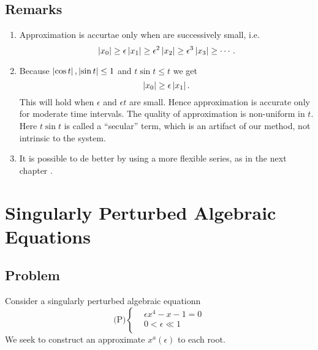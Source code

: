 \documentclass[12pt,twoside]{article}
\begin{document}
\subsection{Remarks}
\begin{enumerate}[(1)]
\item Approximation is accurtae only when are successively small, i.e.
$$\left|{x_0}\right|\ge\epsilon\left|{x_1}\right|\ge\epsilon^2\left|{x_2}\right|\ge\epsilon^3\left|{x_3}\right|\ge\cdots.$$
\item Because $\left|{\cos t}\right|,\left|{\sin t}\right|\le1$ and $t\sin t\le t$ we get
$$\left|{x_0}\right|\ge\epsilon\left|{x_1}\right|.$$ This will hold when $\epsilon$ and $\epsilon
t$ are small. Hence approximation is accurate only for moderate time intervals.
The quality of approximation is non-uniform in $t$. Here $t\sin t$ is called a
``secular'' term, which is an artifact of our method, not intrinsic to the
system.
\item It is possible to de better by using a more flexible series, as in the
  next chapter .
\end{enumerate}

\section{}
\todo{}

\section{Singularly Perturbed Algebraic Equations}
\subsection{Problem}
Consider a singularly perturbed algebraic equationn
\begin{equation*}\text{(P)} \left\{
  \begin{aligned}
    &\epsilon x^4-x-1=0 \\
    &0<\epsilon\ll1 \\
  \end{aligned} \right.
\end{equation*}
We seek to construct an approximate $x^a(\epsilon)$ to each root.
\end{document}
